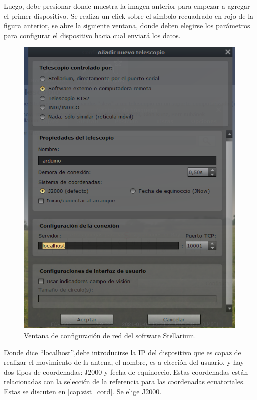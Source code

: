 Luego, debe presionar donde muestra la imagen anterior para empezar a agregar el primer dispositivo. Se realiza un click sobre el símbolo recuadrado en rojo de la figura anterior, se abre la siguiente ventana, donde deben elegirse los parámetros para configurar el dispositivo hacia cual enviará los datos.
\begin{figure}
	\centering
	\includegraphics[scale=0.5]{stellarium-024}
	\caption{Ventana de configuración de red del software Stellarium.}
\end{figure} 
Donde dice ``localhost'',debe introducirse la IP del dispositivo que es capaz de realizar el movimiento de la antena, el nombre, es a elección del usuario, y hay dos tipos de coordenadas: J2000 y fecha de equinoccio. Estas coordenadas están relacionadas con la selección de la referencia para las coordenadas ecuatoriales. Estas se discuten en \ref{cap:sist_cord}. Se elige J2000.

